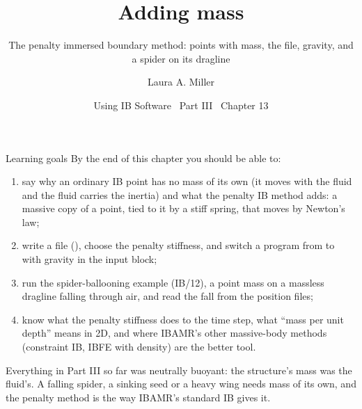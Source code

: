 \documentclass[aspectratio=169,11pt]{beamer}
\title[Adding mass]{Adding mass}
\subtitle{The penalty immersed boundary method: points with mass, the \code{.mass} file, gravity, and a spider on its dragline}
\author[Miller]{Laura A. Miller}
\institute[UArizona]{Department of Mathematics, University of Arizona}
\date{Using IB Software \textbullet\ Part III \textbullet\ Chapter 13}
\begin{document}
\begin{frame}[plain]
\end{frame}

\begin{frame}{Learning goals}
\label{fr:goals}
\footnotesize By the end of this chapter you should be able to:
\begin{enumerate}
  \item say why an ordinary IB point has no mass of its own (it moves with the fluid and the fluid carries the inertia) and what the penalty IB method adds: a massive copy of a point, tied to it by a stiff spring, that moves by Newton's law;
  \item write a  file (), choose the penalty stiffness, and switch a program from  to  with gravity in the input block;
  \item run the spider-ballooning example (IB/12), a point mass on a massless dragline falling through air, and read the fall from the position files;
  \item know what the penalty stiffness does to the time step, what ``mass per unit depth'' means in 2D, and where IBAMR's other massive-body methods (constraint IB, IBFE with density) are the better tool.
\end{enumerate}
\begin{punchbox}
\footnotesize Everything in Part III so far was neutrally buoyant: the structure's mass was the fluid's. A falling spider, a sinking seed or a heavy wing needs mass of its own, and the penalty method is the way IBAMR's standard IB gives it.
\end{punchbox}
\end{frame}
\end{document}
